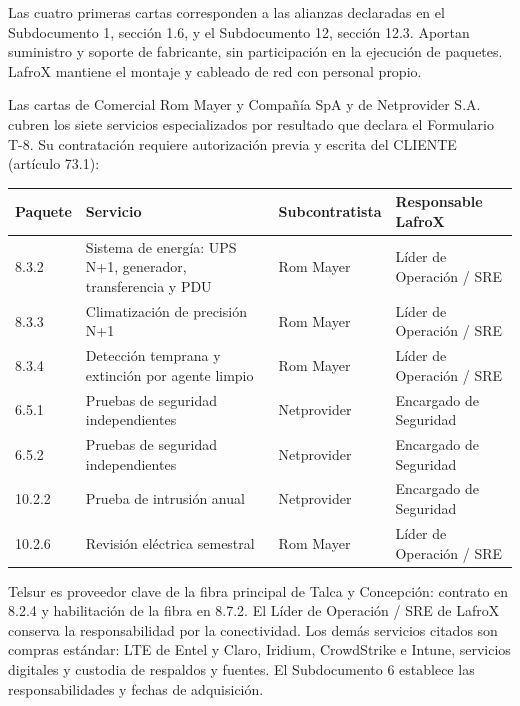 \documentclass[11pt]{article}
\begin{document}
\par\smallskip
Las cuatro primeras cartas corresponden a las alianzas declaradas en el Subdocumento 1, sección 1.6, y el Subdocumento 12, sección 12.3. Aportan suministro y soporte de fabricante, sin participación en la ejecución de paquetes. LafroX mantiene el montaje y cableado de red con personal propio.

Las cartas de Comercial Rom Mayer y Compañía SpA y de Netprovider S.A. cubren los siete servicios especializados por resultado que declara el Formulario T-8. Su contratación requiere autorización previa y escrita del CLIENTE (artículo 73.1):\par\smallskip
\small\renewcommand{\arraystretch}{1.2}
\begin{tabularx}{\linewidth}{@{}p{1.4cm} X p{2.6cm} p{3.6cm}@{}}
\toprule\textbf{Paquete} & \textbf{Servicio} & \textbf{Subcontratista} & \textbf{Responsable LafroX}\\\midrule
8.3.2 & Sistema de energía: UPS N+1, generador, transferencia y PDU & Rom Mayer & Líder de Operación / SRE\\
8.3.3 & Climatización de precisión N+1 & Rom Mayer & Líder de Operación / SRE\\
8.3.4 & Detección temprana y extinción por agente limpio & Rom Mayer & Líder de Operación / SRE\\
6.5.1 & Pruebas de seguridad independientes & Netprovider & Encargado de Seguridad\\
6.5.2 & Pruebas de seguridad independientes & Netprovider & Encargado de Seguridad\\
10.2.2 & Prueba de intrusión anual & Netprovider & Encargado de Seguridad\\
10.2.6 & Revisión eléctrica semestral & Rom Mayer & Líder de Operación / SRE\\\bottomrule
\end{tabularx}\par
\normalsize
Telsur es proveedor clave de la fibra principal de Talca y Concepción: contrato en 8.2.4 y habilitación de la fibra en 8.7.2. El Líder de Operación / SRE de LafroX conserva la responsabilidad por la conectividad. Los demás servicios citados son compras estándar: LTE de Entel y Claro, Iridium, CrowdStrike e Intune, servicios digitales y custodia de respaldos y fuentes. El Subdocumento 6 establece las responsabilidades y fechas de adquisición.
\end{document}
